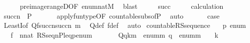 \begin{isabellebody}
\ \ \ \ \isamarkupfalse%
\ preimage{\isacharunderscore}{\kern0pt}rangeD{\isacharbrackleft}{\kern0pt}OF\ {\isacartoucheopen}enum{\isacharcolon}{\kern0pt}nat{\isasymrightarrow}M{\isacartoucheclose}{\isacharbrackright}{\kern0pt}\ \isamarkupfalse%
\ blast\isanewline
\ \ \isamarkupfalse%
\ \isamarkupfalse%
\ succ\isanewline
\ \ \isamarkupfalse%
\ \isamarkupfalse%
\ calculation\isanewline
\ \ \isamarkupfalse%
\ {\isachardoublequoteopen}{\isasymD}{\isacharbackquote}{\kern0pt}succ{\isacharparenleft}{\kern0pt}n{\isacharparenright}{\kern0pt}\ {\isasymsubseteq}\ P{\isachardoublequoteclose}\ \isanewline
\ \ \ \ \isamarkupfalse%
\ apply{\isacharunderscore}{\kern0pt}funtype{\isacharbrackleft}{\kern0pt}OF\ countable{\isacharunderscore}{\kern0pt}subs{\isacharunderscore}{\kern0pt}of{\isacharunderscore}{\kern0pt}P{\isacharbrackright}{\kern0pt}\ \isamarkupfalse%
\ auto\isanewline
\ \ \isamarkupfalse%
\isanewline
\ \ \isamarkupfalse%
\ {\isacharquery}{\kern0pt}case\isanewline
\ \ \ \ \isamarkupfalse%
\ LeastI{\isacharbrackleft}{\kern0pt}of\ {\isachardoublequoteopen}Q{\isacharparenleft}{\kern0pt}f{\isacharparenleft}{\kern0pt}succ{\isacharparenleft}{\kern0pt}n{\isacharparenright}{\kern0pt}{\isacharparenright}{\kern0pt}{\isacharcomma}{\kern0pt}succ{\isacharparenleft}{\kern0pt}n{\isacharparenright}{\kern0pt}{\isacharparenright}{\kern0pt}{\isachardoublequoteclose}\ m{\isacharbrackright}{\kern0pt}\ \isamarkupfalse%
\ Q{\isacharunderscore}{\kern0pt}def\ f{\isacharunderscore}{\kern0pt}def\ \isamarkupfalse%
\ auto\isanewline
{}\isamarkupfalse%
%
\endisatagproof
{\isafoldproof}%
%
\isadelimproof
\isanewline
%
\endisadelimproof
\isanewline
{}\isamarkupfalse%
\ countable{\isacharunderscore}{\kern0pt}RS{\isacharunderscore}{\kern0pt}sequence{\isacharcolon}{\kern0pt}\isanewline
\ \ \ p\ enum\isanewline
\ \ \ {\isachardoublequoteopen}f\ {\isasymequiv}\ {\isasymlambda}n{\isasymin}nat{\isachardot}{\kern0pt}\ RS{\isacharunderscore}{\kern0pt}seq{\isacharparenleft}{\kern0pt}n{\isacharcomma}{\kern0pt}P{\isacharcomma}{\kern0pt}leq{\isacharcomma}{\kern0pt}p{\isacharcomma}{\kern0pt}enum{\isacharcomma}{\kern0pt}{\isasymD}{\isacharparenright}{\kern0pt}{\isachardoublequoteclose}\isanewline
\ \ \ \ \ \ \ {\isachardoublequoteopen}Q{\isacharparenleft}{\kern0pt}q{\isacharcomma}{\kern0pt}k{\isacharcomma}{\kern0pt}m{\isacharparenright}{\kern0pt}\ {\isasymequiv}\ enum{\isacharbackquote}{\kern0pt}m{\isasympreceq}\ q\ {\isasymand}\ enum{\isacharbackquote}{\kern0pt}m\ {\isasymin}\ {\isasymD}\ {\isacharbackquote}{\kern0pt}\ k{\isachardoublequoteclose}\isanewline

\end{isabellebody}
